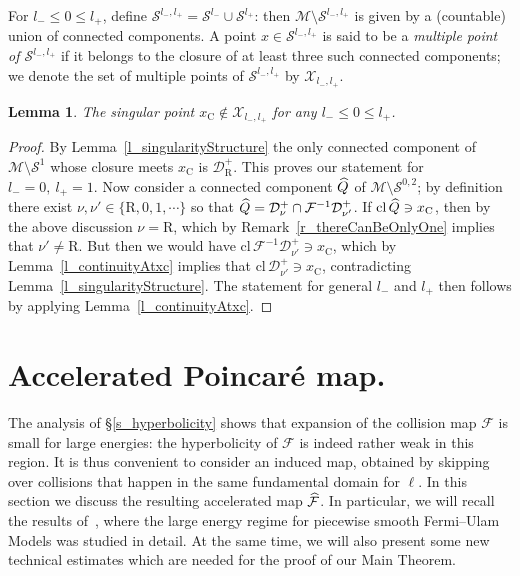 \documentclass[10pt]{amsart}
\newtheorem{lemm}[theo]{Lemma}\newtheorem{prop}[theo]{Proposition}\newtheorem{coro}[theo]{Corollary}\newtheorem{conj}[theo]{Conjecture}
\theoremstyle{definition}\newtheorem{defi}[theo]{Definition}\newtheorem{rema}[theo]{Remark}\newtheorem{exam}[theo]{Example}\newtheorem{exem}[theo]{Example}\newtheorem{nota}[theo]{Notation}
\newcommand{\nin}{\not\in}
\newcommand{\cl}[1]{\mathrm{cl}\,#1}
\newcommand{\inv}{^{-1}}
\newcommand{\crit}{\mathrm{C}}
\newcommand{\xc}{x_\crit}
\newcommand{\cm}{\mathcal{F}}
\newcommand{\cell}{\mathcal{D}}
\newcommand{\csp}{\mathcal{M}}
\newcommand{\cmp}{\hat\cm}
\newcommand{\recoPrivate}{\mathrm{R}}
\newcommand{\backReco}{{\cell^+_{\recoPrivate}}}
\newcommand{\singPrivate}{\mathcal{S}}
\newcommand{\sing}[1]{\singPrivate^{#1}}
\newcommand{\cc}{\hat Q}
\newcommand{\indCell}{\nu}
\newcommand{\multPrivate}{\mathcal{X}}
\newcommand{\mult}[1]{\multPrivate_{#1}}
\let\oldhat\hat
\renewcommand*{\hat}[1]{\mathchoice{\widehat{#1}}{\widehat{#1}}{\oldhat{#1}}{\oldhat{#1}}}
\begin{document}
For $l_- \le 0 \le l_+$, define $\sing{l_-,l_+} = \sing{l_-}\cup\sing{l_+}$: then $\csp\setminus\sing{l_-,l_+}$ is given by a (countable) union of connected components. A point $x\in\sing{l_-,l_+}$ is said to be a
\emph{multiple point of $\sing{l_-,l_+}$} if it belongs to the closure of at least three such connected components; we denote the set of multiple points of $\sing{l_-,l_+}$ by $\mult{l_-,l_+}$.


\begin{lemm}\label{l_singularPointNotMultiple}
The singular point $\xc\nin\mult{l_-,l_+}$ for any $l_- \le 0 \le l_+$.
\end{lemm}
\begin{proof}
By Lemma~\ref{l_singularityStructure} the only connected component of $\csp\setminus\sing1$ whose closure meets $\xc$ is $\backReco$. This proves our statement for $l_- = 0,\ l_+ = 1$. Now consider a connected component $\cc$ of $\csp\setminus\sing{0,2}$; by definition there exist $\indCell,\indCell'\in\{\recoPrivate,0,1,\cdots\}$ so that $\cc = \cell^+_\indCell\cap\cm\inv\cell^+_{\indCell'}$. If $\cl\cc\ni\xc$, then by the above discussion $\indCell = \recoPrivate$, which by Remark~\ref{r_thereCanBeOnlyOne} implies that $\indCell'\ne\recoPrivate$. But then we would have $\cl\cm\inv\cell^+_{\indCell'}\ni\xc$, which by Lemma~\ref{l_continuityAtxc} implies that $\cl\cell^+_{\indCell'}\ni\xc$, contradicting Lemma~\ref{l_singularityStructure}. The statement for general $l_-$ and $l_+$ then follows by applying Lemma~\ref{l_continuityAtxc}.
\end{proof}

\section{Accelerated Poincaré map.}\label{sec:accel-poinc-map}
The analysis of \S\ref{s_hyperbolicity} shows that expansion of the collision map $\cm$ is small for large energies: the hyperbolicity of $\cm$ is indeed rather weak in this region. It is thus convenient to consider an induced map, obtained by skipping over collisions that happen in the same fundamental domain for $\ell$. In this section we discuss the resulting accelerated map $\cmp$. In particular, we will recall the results of~\cite{fum}, where the large energy regime for piecewise smooth Fermi--Ulam Models was studied in detail. At the same time, we will also present some new technical estimates which are needed for the proof of our Main Theorem.
\end{document}
